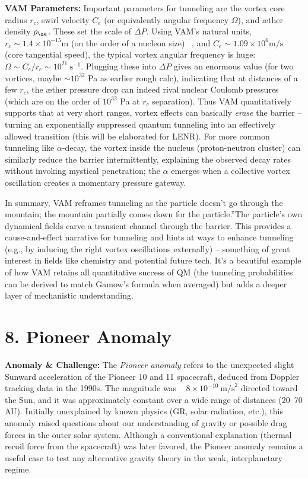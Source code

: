 \documentclass[a4paper, aps,preprint,superscriptaddress, 12pt]{revtex4}
\begin{document}
\textbf{VAM Parameters:} Important parameters for tunneling are the vortex core radius $r_c$, swirl velocity $C_e$ (or equivalently angular frequency $\Omega$), and æther density $\rho_{\ae}$. These set the scale of $\Delta P$. Using VAM's natural units, $r_c\sim1.4\times10^{-15}\text{m}$ (on the order of a nucleon size)~\cite{VAM_constants} , and $C_e\sim1.09\times10^6\text{m/s}$~\cite{VAM_constants}  (core tangential speed), the typical vortex angular frequency is huge: $\Omega \sim C_e/r_c \sim 10^{21}~\text{s}^{-1}$. Plugging these into $\Delta P$ gives an enormous value (for two vortices, maybe $\sim10^{32}$ Pa as earlier rough calc), indicating that at distances of a few $r_c$, the æther pressure drop can indeed rival nuclear Coulomb pressures (which are on the order of $10^{32}$ Pa at $r_c$ separation). Thus VAM quantitatively supports that at very short ranges, vortex effects can basically \textit{erase} the barrier – turning an exponentially suppressed quantum tunneling into an effectively allowed transition (this will be elaborated for LENR). For more common tunneling like $\alpha$-decay, the vortex inside the nucleus (proton-neutron cluster) can similarly reduce the barrier intermittently, explaining the observed decay rates without invoking mystical penetration; the $\alpha$ emerges when a collective vortex oscillation creates a momentary pressure gateway.


In summary, VAM reframes tunneling as \grqq the particle doesn't go through the mountain; the mountain partially comes down for the particle.\textquotedblright The particle's own dynamical fields carve a transient channel through the barrier. This provides a cause-and-effect narrative for tunneling and hints at ways to enhance tunneling (e.g., by inducing the right vortex oscillations externally) – something of great interest in fields like chemistry and potential future tech. It's a beautiful example of how VAM retains all quantitative success of QM (the tunneling probabilities can be derived to match Gamow's formula when averaged) but adds a deeper layer of mechanistic understanding.


\section*{8. Pioneer Anomaly}

\textbf{Anomaly \& Challenge: } The \textit{Pioneer anomaly} refers to the unexpected slight Sunward acceleration of the Pioneer 10 and 11 spacecraft, deduced from Doppler tracking data in the 1990s. The magnitude was ~ $8\times10^{-10}~\text{m/s}^2$ directed toward the Sun, and it was approximately constant over a wide range of distances (20–70 AU). Initially unexplained by known physics (GR, solar radiation, etc.), this anomaly raised questions about our understanding of gravity or possible drag forces in the outer solar system. Although a conventional explanation (thermal recoil force from the spacecraft) was later favored, the Pioneer anomaly remains a useful case to test any alternative gravity theory in the weak, interplanetary regime.
\end{document}
